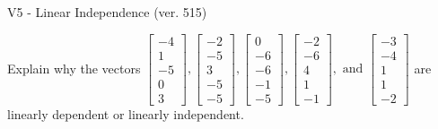 \begin{exercise}
  \begin{exerciseTitle}V5 - Linear Independence (ver. 515)\end{exerciseTitle}
  \begin{exerciseStatement}
    Explain why the vectors \(\left[\begin{array}{r}
-4 \\
1 \\
-5 \\
0 \\
3
\end{array}\right] , \left[\begin{array}{r}
-2 \\
-5 \\
3 \\
-5 \\
-5
\end{array}\right] , \left[\begin{array}{r}
0 \\
-6 \\
-6 \\
-1 \\
-5
\end{array}\right] , \left[\begin{array}{r}
-2 \\
-6 \\
4 \\
1 \\
-1
\end{array}\right] , \text{ and } \left[\begin{array}{r}
-3 \\
-4 \\
1 \\
1 \\
-2
\end{array}\right]\) are linearly dependent or linearly independent.	



\end{exerciseStatement}
\end{exercise}
